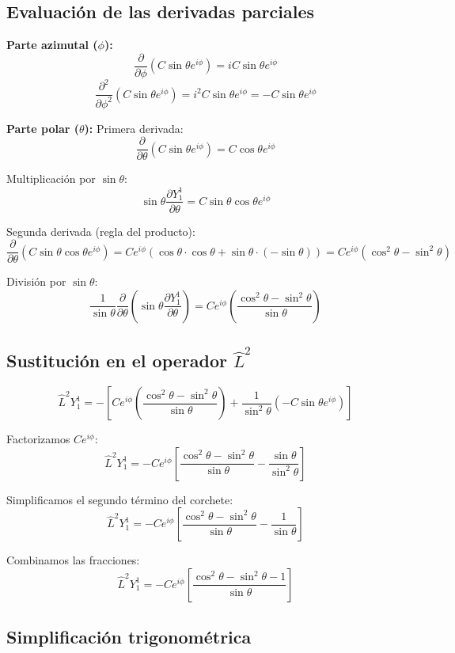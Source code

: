 \documentclass[a4paper]{article}
\begin{document}
\subsection{Evaluación de las derivadas parciales}

\textbf{Parte azimutal ($\phi$):}
$$ \frac{\partial}{\partial\phi} \left( C \sin\theta e^{i\phi} \right) = i C \sin\theta e^{i\phi} $$
$$ \frac{\partial^2}{\partial\phi^2} \left( C \sin\theta e^{i\phi} \right) = i^2 C \sin\theta e^{i\phi} = -C \sin\theta e^{i\phi} $$

\textbf{Parte polar ($\theta$):}
Primera derivada:
$$ \frac{\partial}{\partial\theta} \left( C \sin\theta e^{i\phi} \right) = C \cos\theta e^{i\phi} $$

Multiplicación por $\sin\theta$:
$$ \sin\theta \frac{\partial Y_1^1}{\partial\theta} = C \sin\theta \cos\theta e^{i\phi} $$

Segunda derivada (regla del producto):
$$ \frac{\partial}{\partial\theta} \left( C \sin\theta \cos\theta e^{i\phi} \right) = C e^{i\phi} \left( \cos\theta \cdot \cos\theta + \sin\theta \cdot (-\sin\theta) \right) = C e^{i\phi} (\cos^2\theta - \sin^2\theta) $$

División por $\sin\theta$:
$$ \frac{1}{\sin\theta} \frac{\partial}{\partial\theta} \left( \sin\theta \frac{\partial Y_1^1}{\partial\theta} \right) = C e^{i\phi} \left( \frac{\cos^2\theta - \sin^2\theta}{\sin\theta} \right) $$

\subsection{Sustitución en el operador $\hat{L}^2$}

$$ \hat{L}^2 Y_1^1 = -\left[ C e^{i\phi} \left( \frac{\cos^2\theta - \sin^2\theta}{\sin\theta} \right) + \frac{1}{\sin^2\theta} \left( -C \sin\theta e^{i\phi} \right) \right] $$

Factorizamos $C e^{i\phi}$:
$$ \hat{L}^2 Y_1^1 = - C e^{i\phi} \left[ \frac{\cos^2\theta - \sin^2\theta}{\sin\theta} - \frac{\sin\theta}{\sin^2\theta} \right] $$

Simplificamos el segundo término del corchete:
$$ \hat{L}^2 Y_1^1 = - C e^{i\phi} \left[ \frac{\cos^2\theta - \sin^2\theta}{\sin\theta} - \frac{1}{\sin\theta} \right] $$

Combinamos las fracciones:
$$ \hat{L}^2 Y_1^1 = - C e^{i\phi} \left[ \frac{\cos^2\theta - \sin^2\theta - 1}{\sin\theta} \right] $$

\subsection{Simplificación trigonométrica}
\end{document}
